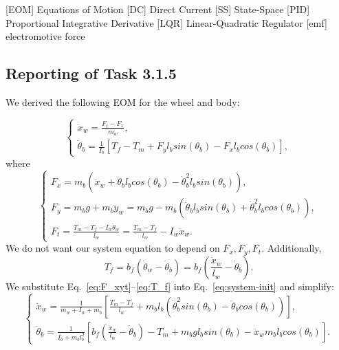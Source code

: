 \documentclass[11pt]{article} %
\begin{document}
\begin{acronym}[TDMA]
		[EOM]	{Equations of Motion}
		[DC]	{Direct Current}
		[SS]	{State-Space}
		[PID]	{Proportional Integrative Derivative}
		[LQR]	{Linear-Quadratic Regulator}
		[emf]	{electromotive force}
\end{acronym}

\subsection*{Reporting of Task 3.1.5}
We derived the following \ac{EOM} for the wheel and body:

\begin{equation}\label{eq:system-init}
  \begin{cases}
    \ddot{x}_w = \frac{F_t - F_x}{m_w}, \\[1em]
    \ddot{\theta}_b =
    \frac{1}{I_b}\left[
      T_f
      - T_m
      + F_y l_b sin(\theta_b)
      - F_x l_b cos(\theta_b)
    \right],
  \end{cases}
\end{equation}
where
\begin{equation}\label{eq:F_xyt}
  \begin{cases}
    F_x = m_b\left(
      \ddot{x}_w
      + \ddot{\theta}_b l_b cos(\theta_b)
      - \dot{\theta}^2_b l_b sin(\theta_b)
    \right), \\[1em]
    F_y = m_b g+ m_b \ddot{y}_w = m_b g - m_b\left(
      \ddot{\theta}_b l_b sin(\theta_b)
      + \dot{\theta}^2_b l_b cos(\theta_b)
    \right), \\[1em]
    F_t = \frac{T_m - T_f - I_w \ddot{\theta}_w}{l_w} = \frac{T_m - T_f}{l_w} - I_w \ddot{x}_w.
  \end{cases}
\end{equation}
We do not want our system equation to depend on $F_x, F_y, F_t$.
Additionally,
\begin{equation}\label{eq:T_f}
T_f = b_f\left(
\dot{\theta}_w - \dot{\theta}_b
\right) =
b_f\left(
\frac{\dot{x}_w}{l_w} - \dot{\theta}_b
\right).
\end{equation}
We substitute Eq.~\eqref{eq:F_xyt}--\eqref{eq:T_f} into Eq.~\eqref{eq:system-init} and simplify:
\begin{equation}\label{eq:system}
  \begin{cases}
    \ddot{x}_w = \frac{1}{m_w + I_w + m_b}\left[
      \frac{T_m - T_f}{l_w}
      + m_b l_b \left(\dot{\theta}^2_b sin(\theta_b)
        - \ddot{\theta}_b cos(\theta_b)
      \right)
    \right], \\[1em]
    \ddot{\theta}_b = \frac{1}{I_b + m_b l_b^2}\left[
      b_f\left(\frac{\dot{x}_w}{l_w}
        - \dot{\theta}_b\right)
      - T_m
      + m_b g l_b sin(\theta_b)
      - \ddot{x}_w m_b l_b cos(\theta_b)
    \right].
  \end{cases}
\end{equation}
\end{document}
